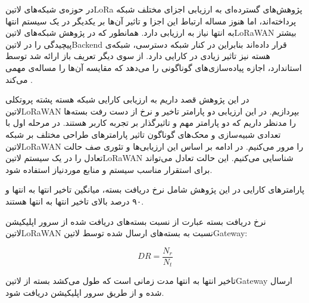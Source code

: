 
در حوزه‌ی شبکه‌های ‌لاتین{LoRa} پژوهش‌های گسترده‌ای به ارزیابی اجزای مختلف شبکه پرداخته‌اند، اما هنوز
مساله ارتباط این اجزا و تاثیر آن‌ها بر یکدیگر در یک سیستم انتها به انتها نیاز به ارزیابی دارد.
همانطور که در پژوهش  شبکه‌های ‌لاتین{LoRaWAN} بیشتر پیچیدگی را
در ‌لاتین{Backend} قرار داده‌اند بنابراین در کنار شبکه دسترسی، شبکه‌ی هسته نیز تاثیر زیادی در کارایی دارد.
از سوی دیگر تعریف باز ارائه شد توسط استاندارد، اجازه پیاده‌سازی‌های گوناگونی را می‌دهد که مقایسه آن‌ها را مساله‌ی مهمی می‌کند
.


در این پژوهش قصد داریم به ارزیابی کارایی شبکه هسته پشته پروتکلی ‌لاتین{LoRaWAN}
بپردازیم. در این ارزیابی دو پارامتر تاخیر و نرخ از دست رفت بسته‌ها را مدنظر داریم که دو پارامتر مهم
و تاثیرگذار بر تجربه کاربر هستند.
در مرحله اول با تعدادی شبیه‌سازی و محک‌های گوناگون تاثیر پارامترهای طراحی مختلف بر شبکه ‌لاتین{LoRaWAN}
را مرور می‌کنیم.
در ادامه بر اساس این ارزیابی‌ها و تئوری صف حالت تعادل را در یک سیستم ‌لاتین{LoRaWAN} شناسایی می‌کنیم.
این حالت تعادل می‌تواند برای استقرار مناسب سیستم و منابع موردنیاز استفاده شود.

پارامترهای کارایی در این پژوهش شامل نرخ دریافت بسته، میانگین تاخیر انتها به انتها و ۹۰ درصد بالای تاخیر انتها به انتها
هستند.

نرخ دریافت بسته عبارت از نسبت بسته‌های دریافت شده از سرور اپلیکیشن ‌لاتین{LoRaWAN}
نسبت به بسته‌های ارسال شده توسط ‌لاتین{Gateway}:

\[
  DR = \frac{N_{r}}{N_{t}}
\]

تاخیر انتها به انتها مدت زمانی است که طول می‌کشد بسته از ‌لاتین{Gateway} ارسال شده
و از طریق سرور اپلیکیشن دریافت شود.
